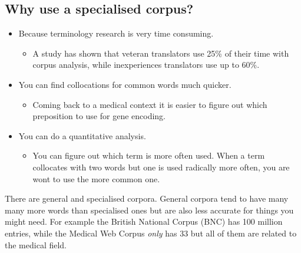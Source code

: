 \documentclass{article}
\begin{document}
	\subsection{Why use a specialised corpus?}
	\begin{itemize}
		\item{Because terminology research is very time consuming.}
		\begin{itemize}
			\item{A study has shown that veteran translators use 25\% of their time with corpus analysis, while inexperiences translators use up to 60\%.}
		\end{itemize}
		\item{You can find collocations for common words much quicker.}
		\begin{itemize}
			\item{Coming back to a medical context it is easier to figure out which preposition to use for gene encoding.}
		\end{itemize}
		\item{You can do a quantitative analysis.}
		\begin{itemize}
			\item{You can figure out which term is more often used. When a term collocates with two words but one is used radically more often, you are wont to use the more common one.}
		\end{itemize}
	\end{itemize}

	There are general and specialised corpora. General corpora tend to have many many more words than specialised ones but are also less accurate for things you might need. For example the British National Corpus (BNC) has 100 million entries, while the Medical Web Corpus \textit{only} has 33 but all of them are related to the medical field.\\
	
\end{document}
